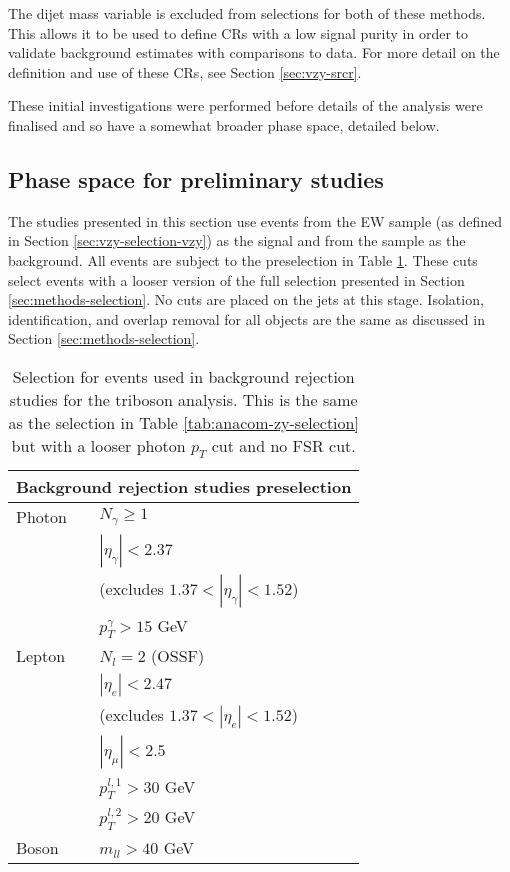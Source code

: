 The dijet mass variable is excluded from selections for both of
these methods. This allows it to be used to define \acp{CR} with a low signal
purity in order to validate background estimates with comparisons to data. For
more detail on the definition and use of these \acp{CR}, see Section
\ref{sec:vzy-srcr}.

These initial investigations were performed before details of the analysis
were finalised and so have a somewhat broader phase space, detailed below.

\subsection{Phase space for preliminary studies}

The studies presented in this section use events from the \ac{EW} \VZy sample
(as defined in Section \ref{sec:vzy-selection-vzy}) as the signal and from the
\QCDZy sample as the background. All events are subject to the
preselection in Table \ref{tab:vzy-bdt-preliminaryselection}.  These cuts select
\Zy events with a looser version of the full \Zy selection presented in
Section \ref{sec:methods-selection}.  No cuts are placed on the jets at this
stage.  Isolation, identification, and overlap removal for all objects are the
same as discussed in Section \ref{sec:methods-selection}.

\begin{table}
  \centering
  \renewcommand\arraystretch{1.3}
  \caption{
    Selection for events used in background rejection studies for the \VZy
    triboson analysis. This is the same as the \Zy selection in Table
    \ref{tab:anacom-zy-selection} but with a looser photon $p_T$ cut and no
    \acs{FSR} cut.
  }
  \begin{tabular}{p{6em}l}
    \hline\hline
    \multicolumn{2}{c}{Background rejection studies preselection} \\
    \hline
    Photon & $N_\gamma \geq 1$ \\
           & $|\eta_\gamma| < 2.37$ \\
           & (excludes $1.37 < |\eta_\gamma| < 1.52$) \\
           & $p_T^\gamma > 15$ GeV \\
    \hline
    Lepton & $N_l = 2$ (OSSF)\\
           & $|\eta_e| < 2.47$ \\
           & (excludes $1.37 < |\eta_e| < 1.52$) \\
           & $|\eta_\mu| < 2.5$ \\
           & $p_T^{l,1} > 30$ GeV \\
           & $p_T^{l,2} > 20$ GeV \\
    \hline
    Boson  & $m_{ll} > 40$ GeV \\
    \hline\hline
  \end{tabular}
  \label{tab:vzy-bdt-preliminaryselection}
\end{table}

